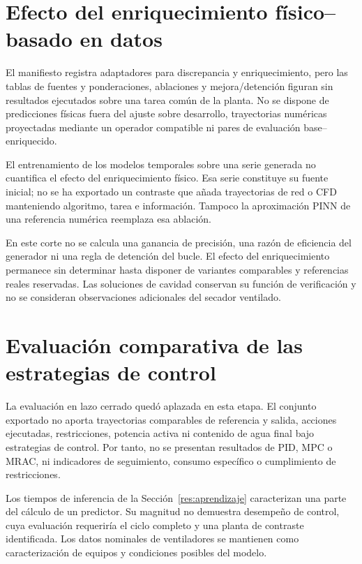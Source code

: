 \FloatBarrier

\section{Efecto del enriquecimiento físico--basado en datos}
\label{res:enriquecimiento}

El manifiesto registra adaptadores para discrepancia y enriquecimiento, pero las tablas de fuentes y ponderaciones, ablaciones y mejora/detención figuran sin resultados ejecutados sobre una tarea común de la planta. No se dispone de predicciones físicas fuera del ajuste sobre desarrollo, trayectorias numéricas proyectadas mediante un operador compatible ni pares de evaluación base--enriquecido.

El entrenamiento de los modelos temporales sobre una serie generada no cuantifica el efecto del enriquecimiento físico. Esa serie constituye su fuente inicial; no se ha exportado un contraste que añada trayectorias de red o CFD manteniendo algoritmo, tarea e información. Tampoco la aproximación PINN de una referencia numérica reemplaza esa ablación.

En este corte no se calcula una ganancia de precisión, una razón de eficiencia del generador ni una regla de detención del bucle. El efecto del enriquecimiento permanece sin determinar hasta disponer de variantes comparables y referencias reales reservadas. Las soluciones de cavidad conservan su función de verificación y no se consideran observaciones adicionales del secador ventilado.

\FloatBarrier

\section{Evaluación comparativa de las estrategias de control}
\label{res:control}

La evaluación en lazo cerrado quedó aplazada en esta etapa. El conjunto exportado no aporta trayectorias comparables de referencia y salida, acciones ejecutadas, restricciones, potencia activa ni contenido de agua final bajo estrategias de control. Por tanto, no se presentan resultados de PID, MPC o MRAC, ni indicadores de seguimiento, consumo específico o cumplimiento de restricciones.

Los tiempos de inferencia de la Sección~\ref{res:aprendizaje} caracterizan una parte del cálculo de un predictor. Su magnitud no demuestra desempeño de control, cuya evaluación requeriría el ciclo completo y una planta de contraste identificada. Los datos nominales de ventiladores se mantienen como caracterización de equipos y condiciones posibles del modelo.

\FloatBarrier